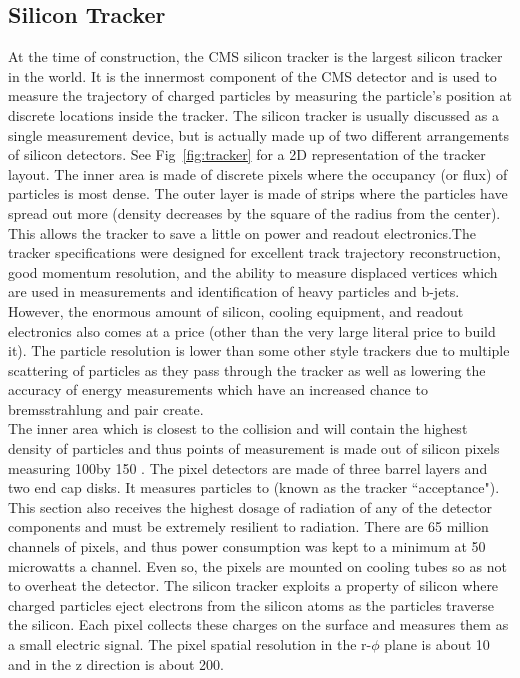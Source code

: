 	\subsection{Silicon Tracker}
	\label{sec:silicon_tracker}
	At the time of construction, the CMS silicon tracker is the largest silicon tracker in the world. It is the innermost component of the CMS detector and is used to measure the trajectory of charged particles by measuring the particle's position at discrete locations inside the tracker. The silicon tracker is usually discussed as a single measurement device, but is actually made up of two different arrangements of silicon detectors. See Fig~\ref{fig:tracker} for a 2D representation of the tracker layout. The inner area is made of discrete pixels where the occupancy (or flux) of particles is most dense. The outer layer is made of strips where the particles have spread out more (density decreases by the square of the radius from the center). This allows the tracker to save a little on power and readout electronics.The tracker specifications were designed for excellent track trajectory reconstruction, good momentum resolution, and the ability to measure displaced vertices which are used in measurements and identification of heavy particles and b-jets.  However, the enormous amount of silicon, cooling equipment, and readout electronics also comes at a price (other than the very large literal price to build it). The particle resolution is lower than some other style trackers due to multiple scattering of particles as they pass through the tracker as well as lowering the accuracy of energy measurements which have an increased chance to bremsstrahlung and pair create.\\
	
	 The inner area which is closest to the collision and will contain the highest density of particles and thus points of measurement is made out of silicon pixels measuring 100\um by 150 \um. The pixel detectors are made of three barrel layers and two end cap disks. It measures particles to \abseta {} (known as the tracker ``acceptance"). This section also receives the highest dosage of radiation of any of the detector components and must be extremely resilient to radiation. There are 65 million channels of pixels, and thus power consumption was kept to a minimum at 50 microwatts a channel. Even so, the pixels are mounted on cooling tubes so as not to overheat the detector. The silicon tracker exploits a property of silicon where charged particles eject electrons from the silicon atoms as the particles traverse the silicon. Each pixel collects these charges on the surface and measures them as a small electric signal. The pixel spatial resolution in the r-$\phi$ plane is about 10 \um and in the z direction is about 200\um.\\
	
